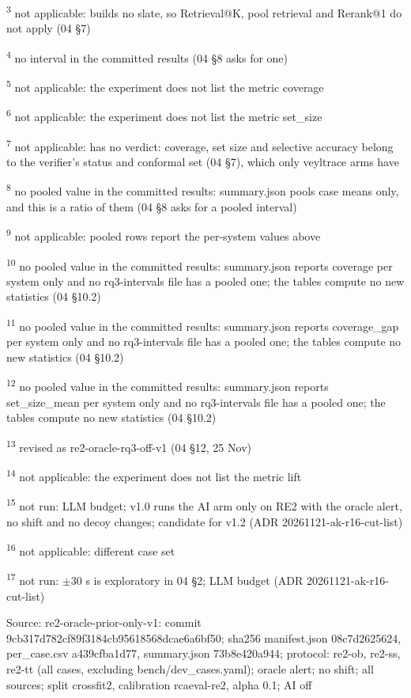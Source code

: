 \textsuperscript{3} not applicable: builds no slate, so Retrieval@K, pool retrieval and Rerank@1 do not apply (04 \S{}7)\par
\textsuperscript{4} no interval in the committed results (04 \S{}8 asks for one)\par
\textsuperscript{5} not applicable: the experiment does not list the metric coverage\par
\textsuperscript{6} not applicable: the experiment does not list the metric set\_size\par
\textsuperscript{7} not applicable: has no verdict: coverage, set size and selective accuracy belong to the verifier's status and conformal set (04 \S{}7), which only veyltrace arms have\par
\textsuperscript{8} no pooled value in the committed results: summary.json pools case means only, and this is a ratio of them (04 \S{}8 asks for a pooled interval)\par
\textsuperscript{9} not applicable: pooled rows report the per-system values above\par
\textsuperscript{10} no pooled value in the committed results: summary.json reports coverage per system only and no rq3-intervals file has a pooled one; the tables compute no new statistics (04 \S{}10.2)\par
\textsuperscript{11} no pooled value in the committed results: summary.json reports coverage\_gap per system only and no rq3-intervals file has a pooled one; the tables compute no new statistics (04 \S{}10.2)\par
\textsuperscript{12} no pooled value in the committed results: summary.json reports set\_size\_mean per system only and no rq3-intervals file has a pooled one; the tables compute no new statistics (04 \S{}10.2)\par
\textsuperscript{13} revised as re2-oracle-rq3-off-v1 (04 \S{}12, 25 Nov)\par
\textsuperscript{14} not applicable: the experiment does not list the metric lift\par
\textsuperscript{15} not run: LLM budget; v1.0 runs the AI arm only on RE2 with the oracle alert, no shift and no decoy changes; candidate for v1.2 (ADR 20261121-ak-r16-cut-list)\par
\textsuperscript{16} not applicable: different case set\par
\textsuperscript{17} not run: $\pm$30 s is exploratory in 04 \S{}2; LLM budget (ADR 20261121-ak-r16-cut-list)\par
\noindent Source: re2-oracle-prior-only-v1: commit 9cb317d782cf89f3184cb95618568dcae6a6bf50; sha256 manifest.json 08c7d2625624, per\_case.csv a439cfba1d77, summary.json 73b8e420a944; protocol: re2-ob, re2-ss, re2-tt (all cases, excluding bench/\allowbreak{}dev\_cases.yaml); oracle alert; no shift; all sources; split crossfit2, calibration rcaeval-re2, alpha 0.1; AI off\par
